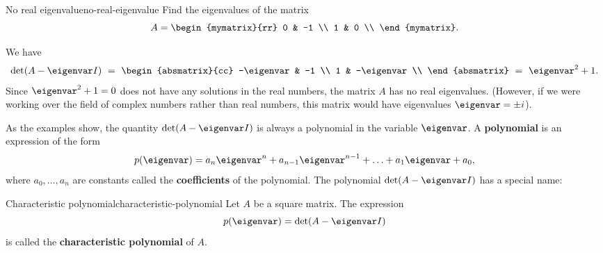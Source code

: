 \begin{example}{No real eigenvalue}{no-real-eigenvalue}
  Find the eigenvalues of the matrix
  \begin{equation*}
    A=\begin{mymatrix}{rr}
      0 & -1 \\
      1 &  0 \\
    \end{mymatrix}.
  \end{equation*}
\end{example}

\begin{solution}
  We have
  \begin{equation*}
    \det(A-\eigenvar I)
    ~=~
        \begin{absmatrix}{cc}
          -\eigenvar & -1 \\
          1 & -\eigenvar \\
        \end{absmatrix} \\
    ~=~
        \eigenvar^2 + 1.
  \end{equation*}
  Since $\eigenvar^2+1 = 0$ does not have any solutions in the real
  numbers, the matrix $A$ has no real eigenvalues. (However, if we
  were working over the field of complex numbers rather than real
  numbers, this matrix would have eigenvalues $\eigenvar=\pm i$).
\end{solution}

As the examples show, the quantity $\det(A-\eigenvar I)$ is always a
polynomial in the variable $\eigenvar$. A \textbf{polynomial}%
 is an expression of the form
\begin{equation*}
  p(\eigenvar) = a_n\eigenvar^n + a_{n-1}\eigenvar^{n-1} + \ldots + a_1\eigenvar + a_0,
\end{equation*}
where $a_0,\ldots,a_n$ are constants called the \textbf{coefficients}%
%
 of the polynomial. The polynomial
$\det(A-\eigenvar I)$ has a special name:

\begin{definition}{Characteristic polynomial}{characteristic-polynomial}
  Let $A$ be a square matrix. The expression
  \begin{equation*}
    p(\eigenvar) = \det(A-\eigenvar I)
  \end{equation*}
  is called the \textbf{characteristic polynomial}%
   of $A$.
\end{definition}

